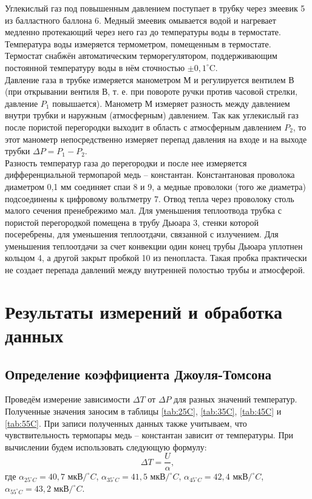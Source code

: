 \documentclass[a4paper, 12pt]{article}
\begin{document}
    \noindent Углекислый газ под повышенным давлением поступает в трубку через змеевик 5 из балластного баллона 6. Медный змеевик омывается водой и нагревает медленно протекающий через него газ до температуры воды в термостате. Температура воды измеряется термометром, помещенным в термостате. Термостат снабжён автоматическим терморегулятором, поддерживающим постоянной температуру воды в нём сточностью $\pm 0,1 ^\circ$C.\\
    
    \noindent Давление газа в трубке измеряется манометром М и регулируется вентилем В (при открывании вентиля В, т. е. при повороте ручки против часовой стрелки, давление $ P_1 $ повышается). Манометр М измеряет разность между давлением внутри трубки и наружным (атмосферным) давлением. Так как углекислый газ после пористой перегородки выходит в область с атмосферным давлением $P_2$, то этот манометр непосредственно измеряет перепад давления на входе и на выходе трубки $\Delta P = P_1 - P_2 $.\\

    \noindent Разность температур газа до перегородки и после нее измеряется дифференциальной термопарой медь -- константан. Константановая проволока диаметром 0,1 мм соединяет спаи 8 и 9, а медные проволоки (того же диаметра) подсоединены к цифровому вольтметру 7. Отвод тепла через проволоку столь малого сечения пренебрежимо мал. Для уменьшения теплоотвода трубка с пористой перегородкой помещена в трубу Дьюара 3, стенки которой посеребрены, для уменьшения теплоотдачи, связанной с излучением. Для уменьшения теплоотдачи за счет конвекции один конец трубы Дьюара уплотнен кольцом 4, а другой закрыт пробкой 10 из пенопласта. Такая пробка практически не создает перепада давлений между внутренней полостью трубы и атмосферой.

    \section*{Результаты измерений и обработка данных}

    \subsection*{Определение коэффициента Джоуля-Томсона}

    \noindent Проведём измерение зависимости $\Delta T$ от $\Delta P$ для разных значений температур. Полученные значения заносим в таблицы \ref{tab:25C}, \ref{tab:35C}, \ref{tab:45C} и \ref{tab:55C}. При записи полученных данных также учитываем, что чувствительность термопары медь -- константан зависит от температуры. При вычислении будем использовать следующую формулу: \[ \Delta T = \frac{U}{\alpha}, \] где $\alpha_{25^\circ C} = 40,7 \text{ мкВ}/^\circ C$, $\alpha_{35^\circ C} = 41,5 \text{ мкВ}/^\circ C$, $\alpha_{45^\circ C} = 42,4 \text{ мкВ}/^\circ C$, $\alpha_{55^\circ C} = 43,2 \text{ мкВ}/^\circ C$.
\end{document}
